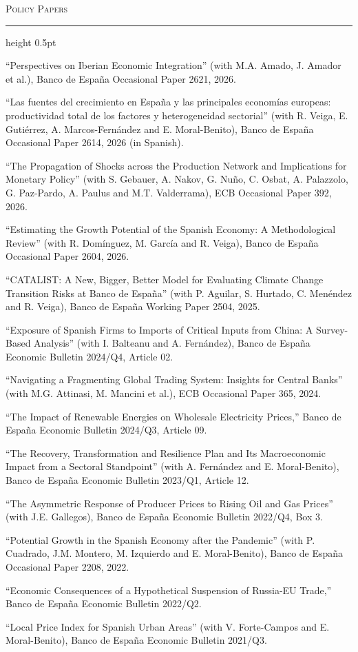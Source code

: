 \documentclass[11pt]{article}
\newcommand{\cvsection}[1]{%
  \vspace{1.1em}\par
  {\large\scshape #1}\par
  \vspace{0.15em}
  \hrule height 0.5pt
  \vspace{0.7em}
}
\newenvironment{cvlist}{%
  \begin{list}{}{%
    \setlength{\leftmargin}{1.4em}%
    \setlength{\itemindent}{-1.4em}%
    \setlength{\itemsep}{0.55em}%
    \setlength{\parsep}{0pt}%
    \setlength{\topsep}{0pt}}%
}{\end{list}}
\begin{document}
\cvsection{Policy Papers}
\begin{cvlist}
\item ``Perspectives on Iberian Economic Integration'' (with M.A. Amado, J. Amador et al.), Banco de España Occasional Paper 2621, 2026.
\item ``Las fuentes del crecimiento en España y las principales economías europeas: productividad total de los factores y heterogeneidad sectorial'' (with R. Veiga, E. Gutiérrez, A. Marcos-Fernández and E. Moral-Benito), Banco de España Occasional Paper 2614, 2026 (in Spanish).
\item ``The Propagation of Shocks across the Production Network and Implications for Monetary Policy'' (with S. Gebauer, A. Nakov, G. Nuño, C. Osbat, A. Palazzolo, G. Paz-Pardo, A. Paulus and M.T. Valderrama), ECB Occasional Paper 392, 2026.
\item ``Estimating the Growth Potential of the Spanish Economy: A Methodological Review'' (with R. Domínguez, M. García and R. Veiga), Banco de España Occasional Paper 2604, 2026.
\item ``CATALIST: A New, Bigger, Better Model for Evaluating Climate Change Transition Risks at Banco de España'' (with P. Aguilar, S. Hurtado, C. Menéndez and R. Veiga), Banco de España Working Paper 2504, 2025.
\item ``Exposure of Spanish Firms to Imports of Critical Inputs from China: A Survey-Based Analysis'' (with I. Balteanu and A. Fernández), Banco de España Economic Bulletin 2024/Q4, Article 02.
\item ``Navigating a Fragmenting Global Trading System: Insights for Central Banks'' (with M.G. Attinasi, M. Mancini et al.), ECB Occasional Paper 365, 2024.
\item ``The Impact of Renewable Energies on Wholesale Electricity Prices,'' Banco de España Economic Bulletin 2024/Q3, Article 09.
\item ``The Recovery, Transformation and Resilience Plan and Its Macroeconomic Impact from a Sectoral Standpoint'' (with A. Fernández and E. Moral-Benito), Banco de España Economic Bulletin 2023/Q1, Article 12.
\item ``The Asymmetric Response of Producer Prices to Rising Oil and Gas Prices'' (with J.E. Gallegos), Banco de España Economic Bulletin 2022/Q4, Box 3.
\item ``Potential Growth in the Spanish Economy after the Pandemic'' (with P. Cuadrado, J.M. Montero, M. Izquierdo and E. Moral-Benito), Banco de España Occasional Paper 2208, 2022.
\item ``Economic Consequences of a Hypothetical Suspension of Russia-EU Trade,'' Banco de España Economic Bulletin 2022/Q2.
\item ``Local Price Index for Spanish Urban Areas'' (with V. Forte-Campos and E. Moral-Benito), Banco de España Economic Bulletin 2021/Q3.
\end{cvlist}
\end{document}
